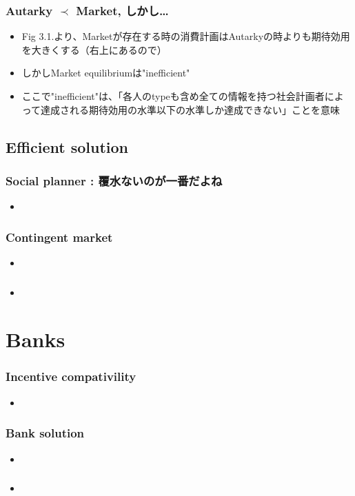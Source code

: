 \documentclass[dvipdfmx, 12pt]{beamer}
\begin{document}
\begin{frame}\frametitle{Autarky $\prec$ Market, しかし…}
	\begin{itemize}
		\item Fig 3.1.より、Marketが存在する時の消費計画はAutarkyの時よりも期待効用を大きくする（右上にあるので）
		\item しかしMarket equilibriumは"inefficient"
		\item ここで"inefficient"は、「各人のtypeも含め全ての情報を持つ社会計画者によって達成される期待効用の水準以下の水準しか達成できない」ことを意味
	\end{itemize}
\end{frame}

\subsection{Efficient solution}
\begin{frame}\frametitle{Social planner : 覆水ないのが一番だよね}
	\begin{itemize}
		\item
	\end{itemize}
\end{frame}
\begin{frame}\frametitle{Contingent market}
	\begin{itemize}
		\item
	\end{itemize}
\end{frame}
\begin{frame}\frametitle{}
	\begin{itemize}
		\item
	\end{itemize}
\end{frame}


\section{Banks}
\begin{frame}\frametitle{Incentive compativility}
	\begin{itemize}
		\item
	\end{itemize}
\end{frame}
\begin{frame}\frametitle{Bank solution}
	\begin{itemize}
		\item
	\end{itemize}
\end{frame}
\begin{frame}\frametitle{}
	\begin{itemize}
		\item
	\end{itemize}
\end{frame}
\end{document}
